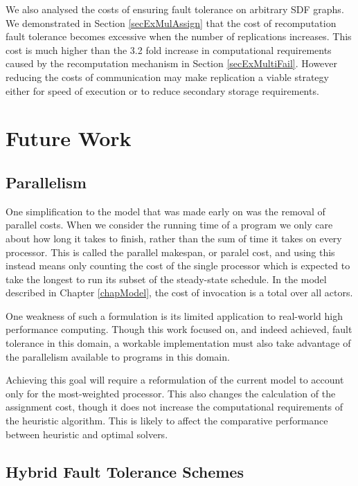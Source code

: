 We also analysed the costs of ensuring fault tolerance on arbitrary SDF graphs.
We demonstrated in Section \ref{secExMulAssign} that the cost of recomputation fault tolerance becomes excessive when the number of replications increases.
This cost is much higher than the 3.2 fold increase in computational requirements caused by the recomputation mechanism in Section \ref{secExMultiFail}.
However reducing the costs of communication may make replication a viable strategy either for speed of execution or to reduce secondary storage requirements.

\section{Future Work}
\label{secConFut}

\subsection{Parallelism}

One simplification to the model that was made early on was the removal of parallel costs.
When we consider the running time of a program we only care about how long it takes to finish, rather than the sum of time it takes on every processor.
This is called the parallel makespan, or paralel cost, and using this instead means only counting the cost of the single processor which is expected to take the longest to run its subset of the steady-state schedule.
In the model described in Chapter \ref{chapModel}, the cost of invocation is a total over all actors.

One weakness of such a formulation is its limited application to real-world high performance computing.
Though this work focused on, and indeed achieved, fault tolerance in this domain, a workable implementation must also take advantage of the parallelism available to programs in this domain.

Achieving this goal will require a reformulation of the current model to account only for the most-weighted processor.
This also changes the calculation of the assignment cost, though it does not increase the computational requirements of the heuristic algorithm.
This is likely to affect the comparative performance between heuristic and optimal solvers.

\subsection{Hybrid Fault Tolerance Schemes}

